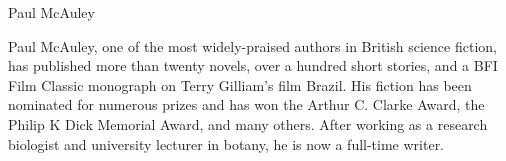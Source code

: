 {\Large Paul McAuley}

\begin{figure}
	\vspace{-10mm}
	\vspace{-10mm}
\end{figure}

Paul McAuley, one of the most widely-praised authors in British science fiction, has published more than twenty novels, over a hundred short stories, and a BFI Film Classic monograph on Terry Gilliam’s film Brazil. His fiction has been nominated for numerous prizes and has won the Arthur C. Clarke Award, the Philip K Dick Memorial Award, and many others. After working as a research biologist and university lecturer in botany, he is now a full-time writer.